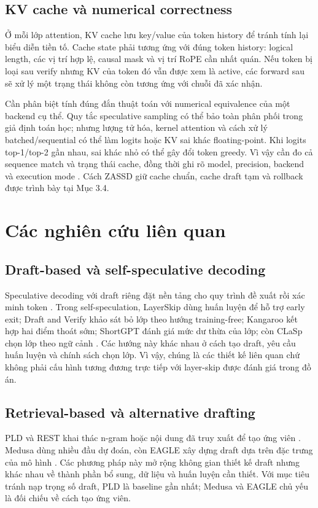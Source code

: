 \subsection{KV cache và numerical correctness}
Ở mỗi lớp attention, KV cache lưu key/value của token history để tránh tính lại biểu diễn tiền tố. Cache state phải tương ứng với đúng token history: logical length, các vị trí hợp lệ, causal mask và vị trí RoPE cần nhất quán. Nếu token bị loại sau verify nhưng KV của token đó vẫn được xem là active, các forward sau sẽ xử lý một trạng thái không còn tương ứng với chuỗi đã xác nhận.

Cần phân biệt tính đúng đắn thuật toán với numerical equivalence của một backend cụ thể. Quy tắc speculative sampling có thể bảo toàn phân phối trong giả định toán học; nhưng lượng tử hóa, kernel attention và cách xử lý batched/sequential có thể làm logits hoặc KV sai khác floating-point. Khi logits top-1/top-2 gần nhau, sai khác nhỏ có thể gây đổi token greedy. Vì vậy cần đo cả sequence match và trạng thái cache, đồng thời ghi rõ model, precision, backend và execution mode \cite{kwon2023pagedattention}. Cách ZASSD giữ cache chuẩn, cache draft tạm và rollback được trình bày tại Mục 3.4.

\section{Các nghiên cứu liên quan}
\subsection{Draft-based và self-speculative decoding}
Speculative decoding với draft riêng đặt nền tảng cho quy trình đề xuất rồi xác minh token \cite{leviathan2023fast,chen2023accelerating}. Trong self-speculation, LayerSkip dùng huấn luyện để hỗ trợ early exit; Draft and Verify khảo sát bỏ lớp theo hướng training-free; Kangaroo kết hợp hai điểm thoát sớm; ShortGPT đánh giá mức dư thừa của lớp; còn CLaSp chọn lớp theo ngữ cảnh \cite{elhoushi2024layerskip,zhang2024draft,liu2024kangaroo,men2024shortgpt,clasp2025}. Các hướng này khác nhau ở cách tạo draft, yêu cầu huấn luyện và chính sách chọn lớp. Vì vậy, chúng là các thiết kế liên quan chứ không phải cấu hình tương đương trực tiếp với layer-skip được đánh giá trong đồ án.

\subsection{Retrieval-based và alternative drafting}
PLD và REST khai thác n-gram hoặc nội dung đã truy xuất để tạo ứng viên \cite{saxena2024promptlookup,he2024rest}. Medusa dùng nhiều đầu dự đoán, còn EAGLE xây dựng draft dựa trên đặc trưng của mô hình \cite{cai2024medusa,li2024eagle}. Các phương pháp này mở rộng không gian thiết kế draft nhưng khác nhau về thành phần bổ sung, dữ liệu và huấn luyện cần thiết. Với mục tiêu tránh nạp trọng số draft, PLD là baseline gần nhất; Medusa và EAGLE chủ yếu là đối chiếu về cách tạo ứng viên.

